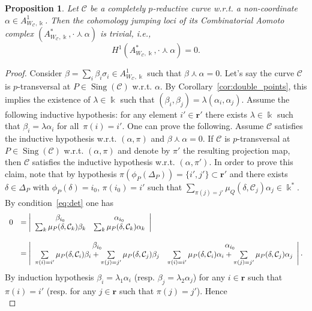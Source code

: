 \documentclass[11pt]{amsart}
\DeclareMathOperator{\Sing}{Sing}
\def\cC{\mathcal{C}}
\def\kk{\Bbbk}
\theoremstyle{plain}
\newtheorem{proposition}[thm]{Proposition}
\theoremstyle{definition}
\begin{document}
\begin{proposition}
	\label{prop:completelypreductive}
	Let $\cC$ be a completely $p$-reductive curve w.r.t. a non-coordinate $\alpha\in A^1_{W_\cC,\kk}$. 
	Then the cohomology jumping loci of its Combinatorial Aomoto complex $(A^*_{W_\cC,\kk},\cdot\curlywedge\alpha)$ is trivial, i.e.,
	$$
	H^1(A^*_{W_\cC,\kk},\cdot\curlywedge\alpha)=0.
	$$
\end{proposition}

\begin{proof}
Consider $\beta=\sum_i \beta_i\sigma_i\in A^1_{W_\cC,\kk}$ such that $\beta\curlywedge\alpha=0$.
Let's say the curve $\cC$ is $p$-transversal at $P\in \Sing(\cC)$ w.r.t. $\alpha$.
By Corollary~\ref{cor:double_points}, this implies the existence of $\lambda\in\kk$ such that $(\beta_i,\beta_j)=\lambda(\alpha_i,\alpha_j)$.
Assume the following inductive hypothesis: for any element $i'\in\mathbf{r}'$ there exists $\lambda\in\kk$ such that 
$\beta_i=\lambda\alpha_i$ for all~$\pi(i)=i'$. One can prove the following. Assume $\cC$ satisfies the inductive hypothesis
w.r.t. $(\alpha,\pi)$ and $\beta\curlywedge\alpha=0$. If $\cC$ is $p$-transversal at $P\in\Sing(\cC)$ w.r.t. $(\alpha,\pi)$ and denote by $\pi'$
the resulting projection map, then $\cC$ satisfies the inductive hypothesis w.r.t. $(\alpha,\pi')$. In order to prove this claim, note that by hypothesis
$\pi(\phi_P(\Delta_P))=\{i',j'\}\subset\mathbf{r}'$ and there exists $\delta\in\Delta_P$ with $\phi_P(\delta)=i_0$, $\pi(i_0)=i'$ such that $\sum_{\pi(j)=j'}\mu_Q(\delta,\cC_{j})\alpha_j\in\kk^*$. By condition~\eqref{eq:det} one has
\begin{equation}
	\label{eq:preduction}
\array{ll}
	0 & = \left| \array{cc} \beta_{i_0} & \alpha_{i_0} \\
	\sum_k \mu_P(\delta,\cC_k)\beta_k  & \sum_k \mu_P(\delta,\cC_k)\alpha_k \endarray \right|\\
	\\
    & =
	\left| \array{cc} \beta_{i_0} & \alpha_{i_0} \\
\sum\limits_{\pi(i)=i'} \mu_P(\delta,\cC_i)\beta_i+\sum\limits_{\pi(j)=j'} \mu_P(\delta,\cC_j)\beta_j & 
\sum\limits_{\pi(i)=i'} \mu_P(\delta,\cC_i)\alpha_i+\sum\limits_{\pi(j)=j'} \mu_P(\delta,\cC_j)\alpha_j \endarray \right|.
\endarray
\end{equation}
By induction hypothesis $\beta_i=\lambda_1\alpha_i$ (resp. $\beta_j=\lambda_2\alpha_j$) for any $i\in\mathbf r$ such that $\pi(i)=i'$
(resp. for any $j\in\mathbf r$ such that $\pi(j)=j'$). Hence
\begin{equation}

\end{equation}
\end{proof}
\end{document}
